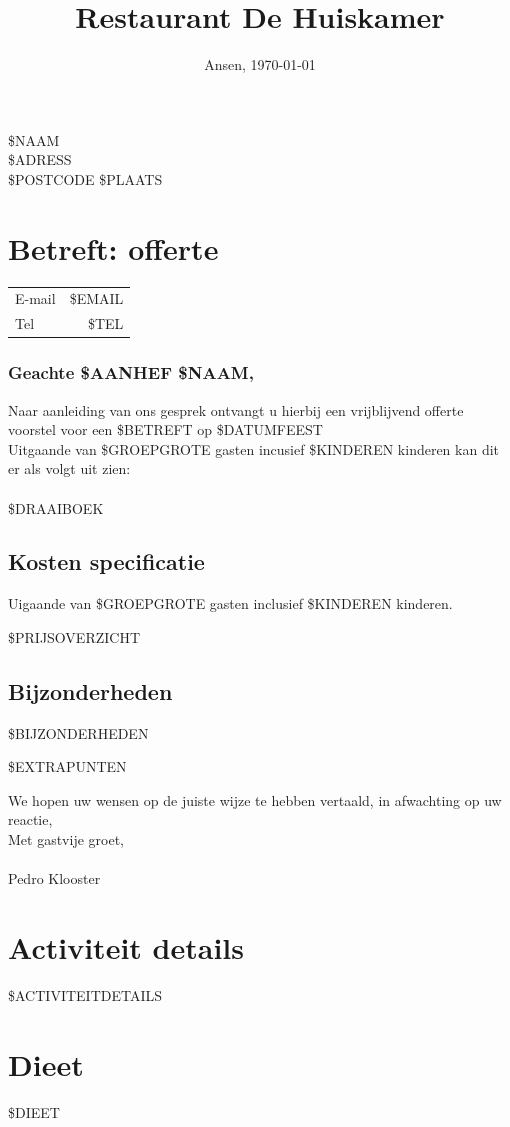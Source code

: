 \documentclass{scrartcl}
\begin{document}

\title{Restaurant De Huiskamer}
\date{Ansen, \today}
\maketitle
\thispagestyle{empty}

\begin{flushright}
	\$NAAM \\
	\$ADRESS \\
	\$POSTCODE \$PLAATS
\end{flushright}
\section*{Betreft: offerte}
\begin{tabular}{l r}
  E-mail & \$EMAIL  \\
  Tel & \$TEL  \\
\end{tabular}

\subsubsection*{Geachte \$AANHEF \$NAAM,}

Naar aanleiding van ons gesprek ontvangt u hierbij een vrijblijvend offerte voorstel
voor een \$BETREFT op \$DATUMFEEST \\

Uitgaande van \$GROEPGROTE gasten incusief \$KINDEREN kinderen kan dit er als volgt uit zien: \\\\
\$DRAAIBOEK

\newpage

\subsection*{Kosten specificatie}
Uigaande van \$GROEPGROTE gasten inclusief \$KINDEREN kinderen.

\$PRIJSOVERZICHT

\subsection*{Bijzonderheden}

\$BIJZONDERHEDEN

\$EXTRAPUNTEN

We hopen uw wensen op de juiste wijze te hebben vertaald, in afwachting op uw reactie, \\

Met gastvije groet, \\\\

Pedro Klooster

\newpage

\section*{Activiteit details}

\$ACTIVITEITDETAILS

\section*{Dieet}

\$DIEET
\end{document}
